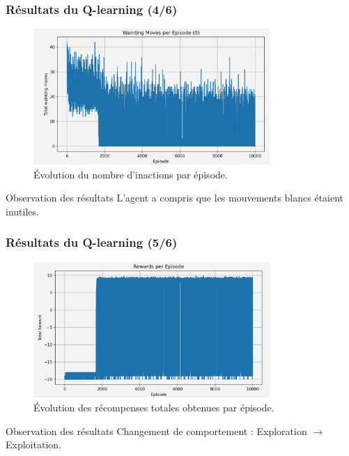 \documentclass[
	11pt, %
]{beamer}
\begin{document}
\begin{frame}
    \frametitle{Résultats du Q-learning (4/6)}
    \begin{figure}
        \centering
        \includegraphics[width=0.8\textwidth]{Images/resultat3.png}
        \caption{Évolution du nombre d'inactions par épisode.}
    \end{figure}
	\begin{block}{Observation des résultats}
        \small L'agent a compris que les mouvements blancs étaient inutiles.
    \end{block}
\end{frame}

\begin{frame}
    \frametitle{Résultats du Q-learning (5/6)}
    \begin{figure}
        \centering
        \includegraphics[width=0.8\textwidth]{Images/resultat1.png}
		\caption{Évolution des récompenses totales obtenues par épisode.}
    \end{figure}
	\begin{block}{Observation des résultats}
        \small Changement de comportement : Exploration $\rightarrow$ Exploitation.
    \end{block}

\end{frame}
\end{document}
